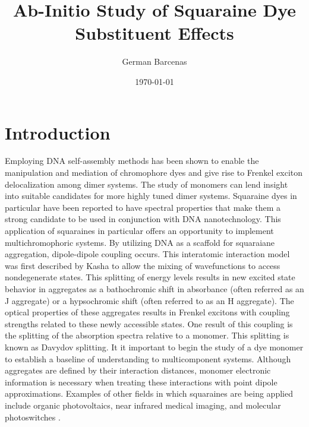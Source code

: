 \documentclass[journal=jacsat,manuscript=article]{achemso}
\title{
Ab-Initio Study of Squaraine Dye Substituent Effects\\
}
\author{German Barcenas}
\affiliation{Boise State University}
\date{\today}
\begin{document}
\maketitle

\section{Introduction}
Employing DNA self-assembly methods has been shown to enable the manipulation and mediation of chromophore dyes and give rise to Frenkel exciton delocalization among dimer systems\cite{Cannon2018LargeAggregates}. The study of monomers can lend insight into suitable candidates for more highly tuned dimer systems. Squaraine dyes in particular have been reported to have spectral properties that make them a strong candidate to be used in conjunction with DNA nanotechnology\cite{Markova2013ComparisonLabels}⁠. This application of squaraines in particular offers an opportunity to implement multichromophoric systems. 
By utilizing DNA as a scaffold for squaraiane aggregation, dipole-dipole coupling occurs\cite{Cannon2017CoherentSystem}. This interatomic interaction model was first described by Kasha to allow the mixing of wavefunctions to access nondegenerate states\cite{Kasha1965TheSpectroscopy}. This splitting of energy levels results in new excited state behavior in aggregates as a bathochromic shift in absorbance (often referred as an J aggregate) or a hypsochromic shift (often referred to as an H aggregate). The optical properties of these aggregates results in Frenkel excitons with coupling strengths related to these newly accessible states. 
One result of this coupling is the splitting of the absorption spectra relative to a monomer. This splitting is known as Davydov splitting\cite{Zhong2019DavydovDimers}. It it important to begin the study of a dye monomer to establish a baseline of understanding to multicomponent systems. Although aggregates are defined by their interaction distances, monomer electronic information is necessary when treating these interactions with point dipole approximations\cite{Abramavicius2009ExtractingSpectra}. Examples of other fields in which squaraines are being applied include organic photovoltaics\citep{Wei2012FunctionalizedPhotovoltaics, Chen2018DensityCell}, near infrared medical imaging\cite{Strassel2018SquaraineNm}⁠, and molecular photoswitches\citep{Kellis2019AnPhases, Scholes2011LessonsHarvesting} .
\end{document}
